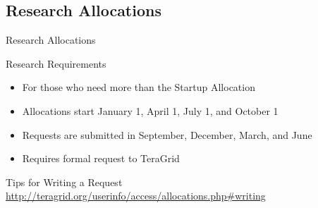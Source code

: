 \documentclass[handout]{beamer}
\begin{document}
  \subsection{Research Allocations}

  \begin{frame}{Research Allocations}
   \begin{block}{Research Requirements}
    \begin{itemize}
     \item For those who need more than the Startup Allocation
     \item Allocations start January 1, April 1, July 1, and October 1
     \item Requests are submitted in September, December, March, and June
     \item Requires formal request to TeraGrid
    \end{itemize}
   \end{block}
   \begin{block}{Tips for Writing a Request}
    \url{http://teragrid.org/userinfo/access/allocations.php\#writing}
   \end{block}
  \end{frame}
\end{document}

